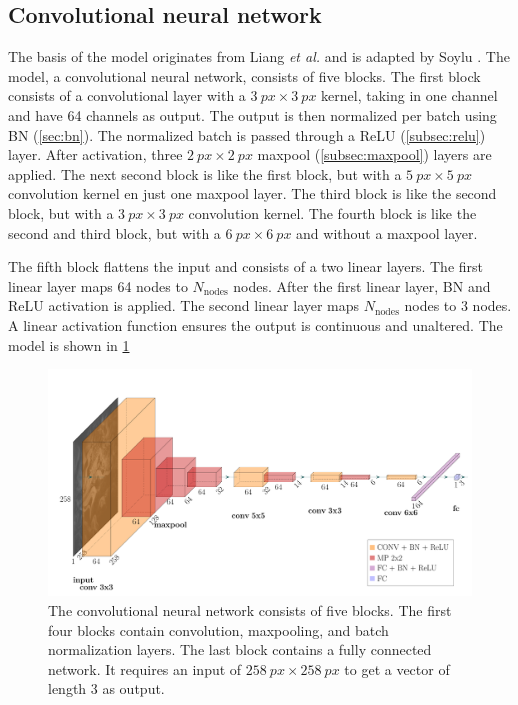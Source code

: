 \subsection{Convolutional neural network}
The basis of the model originates from Liang \emph{et al.} \cite{Liang2017} and is adapted by Soylu \cite{Soylu2022}.
The model, a convolutional neural network, consists of five blocks.
The first block consists of a convolutional layer with a $\qty{3}{px}\times\qty{3}{px}$ kernel, taking in one channel and have 64 channels as output.
The output is then normalized per batch using BN (\cref{sec:bn}).
The normalized batch is passed through a ReLU (\cref{subsec:relu}) layer.
After activation, three $\qty{2}{px}\times\qty{2}{px}$ maxpool (\cref{subsec:maxpool}) layers are applied.
The next second block is like the first block, but with a $\qty{5}{px}\times\qty{5}{px}$ convolution kernel en just one maxpool layer.
The third block is like the second block, but with a $\qty{3}{px}\times\qty{3}{px}$ convolution kernel.
The fourth block is like the second and third block, but with a $\qty{6}{px}\times\qty{6}{px}$ and without a maxpool layer.

The fifth block flattens the input and consists of a two linear layers.
The first linear layer maps 64 nodes to $N_\mathrm{nodes}$ nodes.
After the first linear layer, BN and ReLU activation is applied.
The second linear layer maps $N_\mathrm{nodes}$ nodes to 3 nodes.
A linear activation function ensures the output is continuous and unaltered.
The model is shown in \cref{fig:model}

\begin{figure}
    \includegraphics{skinstression/images/skinstression.pdf}
    \caption[Network architecture]{
        The convolutional neural network consists of five blocks.
        The first four blocks contain convolution, maxpooling, and batch normalization layers.
        The last block contains a fully connected network.
        It requires an input of $\qty{258}{px}\times\qty{258}{px}$ to get a vector of length 3 as output.
    }
    \label{fig:model}
\end{figure}

